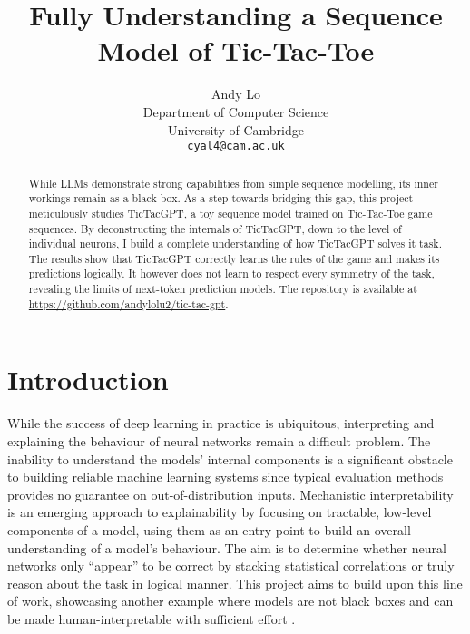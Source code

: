 \documentclass{article}
\title{Fully Understanding a Sequence Model of Tic-Tac-Toe}
\author{%
  Andy Lo \\
  Department of Computer Science\\
  University of Cambridge\\
  \texttt{cyal4@cam.ac.uk} \\
}
\newcommand{\ttgpt}{TicTacGPT\xspace}
\newcommand{\ttt}{Tic-Tac-Toe\xspace}
\begin{document}
\begin{acronym}
\end{acronym}


\maketitle


\begin{abstract}
    While \ac{LLMs} demonstrate strong capabilities from simple sequence modelling, its inner workings remain as a black-box. As a step towards bridging this gap, this project meticulously studies \ttgpt, a toy sequence model trained on \ttt game sequences. By deconstructing the internals of \ttgpt, down to the level of individual neurons, I build a complete understanding of how \ttgpt solves it task. The results show that \ttgpt correctly learns the rules of the game and makes its predictions logically. It however does not learn to respect every symmetry of the task, revealing the limits of next-token prediction models. The repository is available at \url{https://github.com/andylolu2/tic-tac-gpt}.
\end{abstract}


\section{Introduction}

While the success of deep learning in practice is ubiquitous, interpreting and explaining the behaviour of neural networks remain a difficult problem. The inability to understand the models' internal components is a significant obstacle to building reliable machine learning systems since typical evaluation methods provides no guarantee on out-of-distribution inputs. Mechanistic interpretability is an emerging approach to explainability by focusing on tractable, low-level components of a model, using them as an entry point to build an overall understanding of a model's behaviour. The aim is to determine whether neural networks only ``appear'' to be correct by stacking statistical correlations or truly reason about the task in logical manner. This project aims to build upon this line of work, showcasing another example where models are not black boxes and can be made human-interpretable with sufficient effort \cite{nanda2023progress,tigges2023linear,heimersheim2023circuit}.
\end{document}
